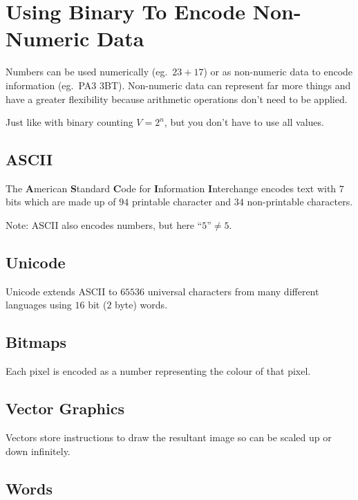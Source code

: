 \section{Using Binary To Encode Non-Numeric Data}\label{sec:using_binary_to_encode_non_numeric_data}

Numbers can be used numerically (eg.\ \(23 + 17\)) or as non-numeric data to encode information (eg.\ PA3 3BT).
Non-numeric data can represent far more things and have a greater flexibility because arithmetic operations don't need to be applied.

Just like with binary counting \(V=2^n\), but you don't have to use all values.

\subsection{ASCII}\label{sub:ascii}

The \textbf{A}merican \textbf{S}tandard \textbf{C}ode for \textbf{I}nformation \textbf{I}nterchange encodes text with \(7\) bits which are made up of \(94\) printable character and \(34\) non-printable characters.

\begin{note}
	Note: ASCII also encodes numbers, but here \(\textrm{``5''} \neq 5\).
\end{note}

\subsection{Unicode}\label{sub:unicode}

Unicode extends ASCII to \(65536\) universal characters from many different languages using \(16\) bit (\(2\) byte) words.

\subsection{Bitmaps}\label{sub:bitmaps}

Each pixel is encoded as a number representing the colour of that pixel.

\subsection{Vector Graphics}\label{sub:vector_graphics}

Vectors store instructions to draw the resultant image so can be scaled up or down infinitely.

\subsection{Words}\label{sub:words}

